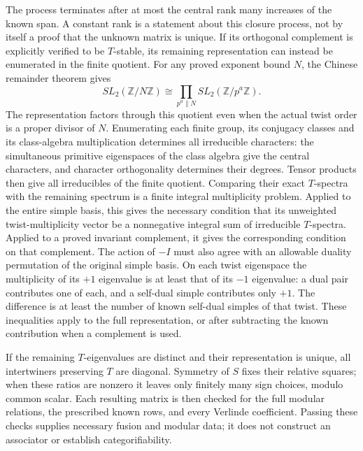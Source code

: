 The process terminates after at most the central rank many increases of
the known span. A constant rank is a statement about this closure process,
not by itself a proof that the unknown matrix is unique. If its orthogonal
complement is explicitly verified to be $T$-stable, its remaining
representation can instead be enumerated in the finite quotient.
For any proved exponent bound $N$, the Chinese remainder theorem gives
\[
 SL_2(\mathbb Z/N\mathbb Z)
 \cong\prod_{p^a\parallel N}SL_2(\mathbb Z/p^a\mathbb Z).
\]
The representation factors through this quotient even when the actual
twist order is a proper divisor of $N$.
Enumerating each finite group, its conjugacy classes and its class-algebra
multiplication determines all irreducible characters: the simultaneous
primitive eigenspaces of the class algebra give the central characters,
and character orthogonality determines their degrees. Tensor products
then give all irreducibles of the finite quotient. Comparing their exact
$T$-spectra with the remaining spectrum is a finite integral multiplicity
problem. Applied to the entire simple basis, this gives the necessary
condition that its unweighted twist-multiplicity vector be a nonnegative
integral sum of irreducible $T$-spectra. Applied to a proved invariant
complement, it gives the corresponding condition on that complement.
The action of $-I$ must also agree with an allowable duality
permutation of the original simple basis. On each twist eigenspace the
multiplicity of its $+1$ eigenvalue is at least that of its $-1$
eigenvalue: a dual pair contributes one of each, and a self-dual simple
contributes only $+1$. The difference is at least the number of known
self-dual simples of that twist. These inequalities apply to the full
representation, or after subtracting the known contribution when a
complement is used.

If the remaining $T$-eigenvalues are distinct and their representation is
unique, all intertwiners preserving $T$ are diagonal. Symmetry of $S$
fixes their relative squares; when these ratios are nonzero it leaves only
finitely many sign choices, modulo common scalar. Each resulting matrix
is then checked for the full modular relations, the prescribed known
rows, and every Verlinde coefficient. Passing these checks supplies
necessary fusion and modular data; it does not construct an associator
or establish categorifiability.
